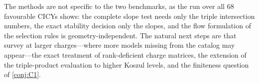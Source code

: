 The methods are not specific to the two benchmarks, as the run over all 68
favourable CICYs shows: the complete slope test needs only the triple
intersection numbers, the exact stability decision only the slopes, and the flow
formulation of the selection rules is geometry-independent. The natural next
steps are that survey at larger charges---where more models missing from the
catalog may appear---the exact treatment of rank-deficient charge matrices, the
extension of the triple-product evaluation to higher Koszul levels, and the
finiteness question of \cref{conj:C1}.
